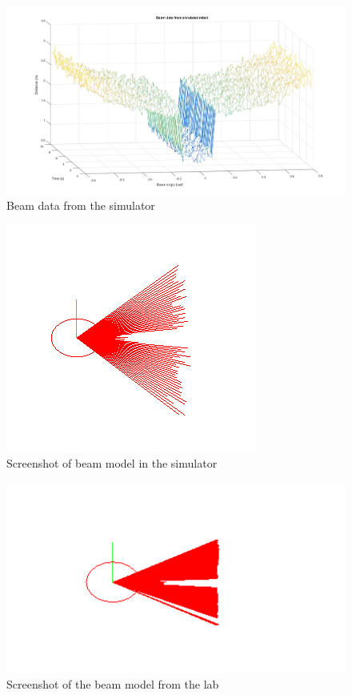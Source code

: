 \documentclass[letterpaper,12pt]{article}
\begin{document}
\begin{figure}
	\centering
	\includegraphics[width=.9\textwidth]{beamsim.jpg}\hfill
	\caption{Beam data from the simulator}
\end{figure}
\begin{figure}
	\centering
	\includegraphics[width=.6\textwidth]{screenshotsim.jpg}\hfill
	\caption{Screenshot of beam model in the simulator}
\end{figure}
\begin{figure}
	\centering
	\includegraphics[width=.6\textwidth]{screenshotlab.jpg}\hfill
	\caption{Screenshot of the beam model from the lab}
\end{figure}
\end{document}
